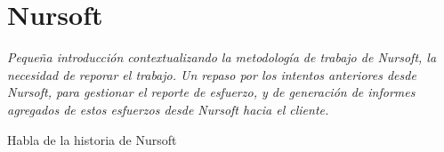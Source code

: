 \section{Nursoft}

\textit{Pequeña introducción contextualizando la metodología de trabajo de Nursoft, la necesidad de reporar el trabajo. 
Un repaso por los intentos anteriores desde Nursoft, para gestionar el reporte de esfuerzo,
y de generación de informes agregados de estos esfuerzos desde Nursoft hacia el cliente.}

Habla de la historia de Nursoft
